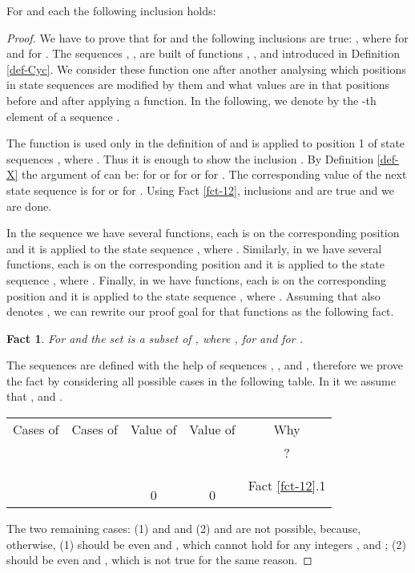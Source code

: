 \documentclass{llncs}
\newtheorem{fact}[theorem]{Fact}
\begin{document}
\begin{lemma}\label{l7}
For  and each  the following inclusion holds:

\end{lemma}
\begin{proof}
We have to prove that for  and  the following inclusions 
are true: , where  for  
and   for . The 
sequences , , are built of functions , 
,  and  introduced in Definition \ref{def-Cyc}. We 
consider these function one after another analysing which positions in state
sequences are modified by them and what values are in that positions before 
and after applying a function. In the following, we denote by  the -th 
element of a sequence .

The function  is used only in the definition of  and is
applied to position 1 of state sequences , where
. Thus it is enough to show the
inclusion . By Definition
\ref{def-X} the argument of  can be: 
for  or  for  or  for . The corresponding value of the next state sequence
is  for  or  for . Using Fact \ref{fct-12}, inclusions  and  are true and we are done.

In the sequence  we have several  functions, each
 is on the corresponding position  and it is applied to the
state sequence , where .
Similarly, in  we have several  functions, each
 is on the corresponding position  and it is applied to the 
state sequence , where .
Finally, in  we have  functions, each 
is on the corresponding position  and it is applied to the state sequence
, where . Assuming that
 also denotes , we can rewrite our proof goal for that
functions as the following fact.
\begin{fact}
For  and  the set  is
a subset of , where ,  for  and
 for .
\end{fact}
The sequences  are defined with the help of sequences , ,
 and , therefore we prove the fact by considering all possible
cases in the following table. In it we assume that ,
 and .
\setlength{\tabcolsep}{3pt}
\begin{center}
\begin{tabular}{||l|l||c|c||c||}
\hline\hline \multicolumn{1}{||c|}{Cases of} & 
      \multicolumn{1}{|c||}{Cases of} & Value of  & Value of  & Why  \\ 
        &   &   &   & 
      ? \\ \hline
\hline  &  &   &   & 
      \multirow{5}{*}{Fact \ref{fct-12}.1}  \\ 
\cline{1-4}  &  &  &  &\\ 
\cline{1-4}  &  &  &  &\\ 
\cline{1-4}  &  &  &  &\\ 
\cline{1-4}  &  & 0 & 0 & \\ 
\hline\hline 
\end{tabular}
\end{center}
The two remaining cases: (1)  and 
 and (2)  
and  are not possible, because, otherwise, (1) 
 should be even and , which cannot hold for 
any integers ,  and ; (2)  should be even and 
, which is not true for the same reason.


\end{proof}
\end{document}
